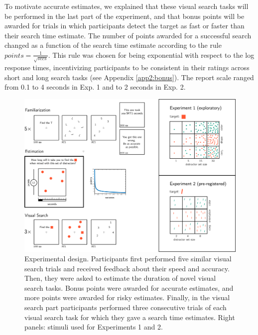 \documentclass[12pt,twoside]{reedthesis}
\begin{document}
To motivate accurate estimates, we explained that these visual search tasks will be performed in the last part of the experiment, and that bonus points will be awarded for trials in which participants detect the target as fast or faster than their search time estimate. The number of points awarded for a successful search changed as a function of the search time estimate according to the rule
\(points=\frac{1}{\sqrt{secs}}\). This rule was chosen for being exponential with respect to the log response times, incentivizing participants to be consistent in their ratings across short and long search tasks (see Appendix \ref{app2:bonus}). The report scale ranged from 0.1 to 4 seconds in Exp. 1 and to 2 seconds in Exp. 2.
\begin{figure}

{\centering \includegraphics[width=1\linewidth]{figure/MVS/methods1} 

}

\caption[Meta visual search: experimental design]{Experimental design. Participants first performed five similar visual search trials and received feedback about their speed and accuracy. Then, they were asked to estimate the duration of novel visual search tasks. Bonus points were awarded for accurate estimates, and more points were awarded for risky estimates. Finally, in the visual search part participants performed three consecutive trials of each visual search task for which they gave a search time estimates. Right panels: stimuli used for Experiments 1 and 2.}\label{fig:MVS-methods1}
\end{figure}
\end{document}
